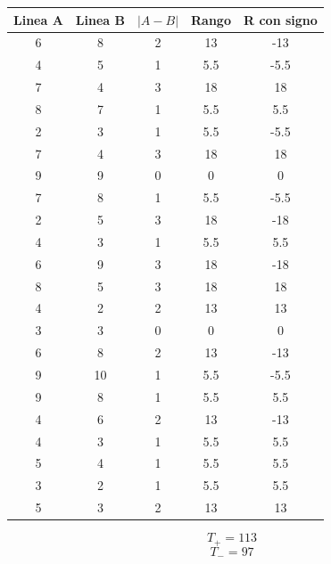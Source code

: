 \documentclass{article}
\begin{document}
\begin{table}[ht]
    \centering
    \begin{tabular}{ccccc}
        \toprule
        Linea A & Linea B & $| A - B|$ & Rango & R con signo \\
        \midrule
        6       & 8       & 2          & 13    & -13         \\
        4       & 5       & 1          & 5.5   & -5.5        \\
        7       & 4       & 3          & 18    & 18          \\
        8       & 7       & 1          & 5.5   & 5.5         \\
        2       & 3       & 1          & 5.5   & -5.5        \\
        7       & 4       & 3          & 18    & 18          \\
        9       & 9       & 0          & 0     & 0           \\
        7       & 8       & 1          & 5.5   & -5.5        \\
        2       & 5       & 3          & 18    & -18         \\
        4       & 3       & 1          & 5.5   & 5.5         \\
        6       & 9       & 3          & 18    & -18         \\
        8       & 5       & 3          & 18    & 18          \\
        4       & 2       & 2          & 13    & 13          \\
        3       & 3       & 0          & 0     & 0           \\
        6       & 8       & 2          & 13    & -13         \\
        9       & 10      & 1          & 5.5   & -5.5        \\
        9       & 8       & 1          & 5.5   & 5.5         \\
        4       & 6       & 2          & 13    & -13         \\
        4       & 3       & 1          & 5.5   & 5.5         \\
        5       & 4       & 1          & 5.5   & 5.5         \\
        3       & 2       & 1          & 5.5   & 5.5         \\
        5       & 3       & 2          & 13    & 13          \\
        \bottomrule
    \end{tabular}
\end{table}
\[T_{+} = 113\]
\[T_{-} = 97\]
\end{document}
